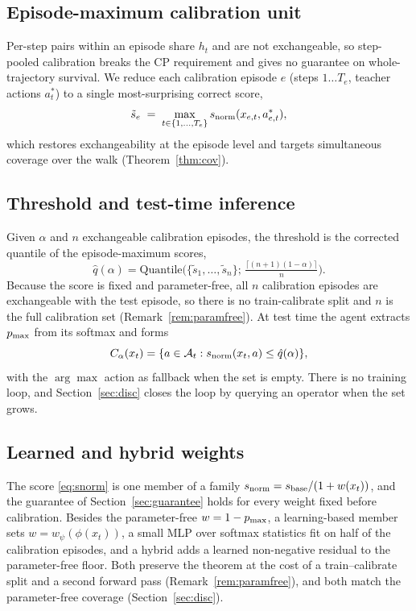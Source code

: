 \subsection{Episode-maximum calibration unit}
\label{ssec:epmax}
Per-step pairs within an episode share $h_t$ and are not exchangeable, so
step-pooled calibration breaks the CP requirement and gives no guarantee on
whole-trajectory survival. We reduce each calibration episode $e$ (steps
$1\dots T_e$, teacher actions $a^*_t$) to a single most-surprising correct
score,
\begin{equation}
\tilde{s}_e \;=\; \max_{t \in \{1,\dots,T_e\}} s_{\mathrm{norm}}(x_{e,t}, a^*_{e,t}),
\label{eq:epmax}
\end{equation}
which restores exchangeability at the episode level and targets simultaneous
coverage over the walk (Theorem~\ref{thm:cov}).

\subsection{Threshold and test-time inference}
\label{ssec:infer}
Given $\alpha$ and $n$ exchangeable calibration episodes, the threshold is
the corrected quantile of the episode-maximum scores,
\begin{equation}
\hat q(\alpha) = \mathrm{Quantile}\Big(\{\tilde s_1,\dots,\tilde s_n\};\,
\tfrac{\lceil(n+1)(1-\alpha)\rceil}{n}\Big).
\label{eq:qhat-ep}
\end{equation}
Because the score is fixed and parameter-free, all $n$ calibration episodes
are exchangeable with the test episode, so there is no train-calibrate split
and $n$ is the full calibration set (Remark~\ref{rem:paramfree}). At test time
the agent extracts $p_{\max}$ from its softmax and forms
\begin{equation}
C_\alpha(x_t) = \{a \in \mathcal{A}_t : s_{\mathrm{norm}}(x_t, a) \leq \hat q(\alpha)\},
\label{eq:set}
\end{equation}
with the $\arg\max$ action as fallback when the set is empty. There is no
training loop, and Section~\ref{sec:disc} closes the loop by querying an
operator when the set grows.

\subsection{Learned and hybrid weights}
\label{ssec:learned}
The score \eqref{eq:snorm} is one member of a family
$s_{\mathrm{norm}}=s_{\mathrm{base}}/(1+w(x_t))$, and the guarantee of
Section~\ref{sec:guarantee} holds for every weight fixed before
calibration. Besides the parameter-free $w=1-p_{\max}$, a learning-based
member sets $w=w_\psi(\phi(x_t))$, a small MLP over softmax statistics fit
on half of the calibration episodes, and a hybrid adds a learned
non-negative residual to the parameter-free floor. Both preserve the
theorem at the cost of a train--calibrate split and a second forward pass
(Remark~\ref{rem:paramfree}), and both match the parameter-free coverage
(Section~\ref{sec:disc}).
